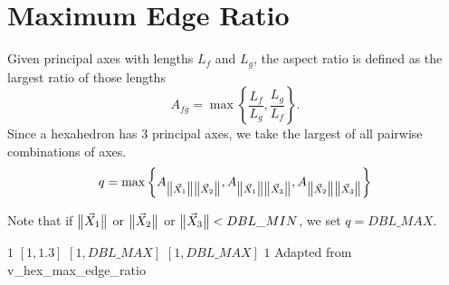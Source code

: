 \section{Maximum Edge Ratio}

Given principal axes with lengths $L_f$ and $L_g$,
the aspect ratio is defined as the largest ratio of those lengths
\[
   A_{fg} = \max\left\{ \frac{L_f}{L_g}, \frac{L_g}{L_f} \right\}.
\]
Since a hexahedron has 3 principal axes, we take the largest of all pairwise combinations of axes.
\[
  q  = \max\left\{
    A_{\big\lVert{\vec X_1 }\big\rVert\big\lVert{\vec X_2 }\big\rVert},
    A_{\big\lVert{\vec X_1 }\big\rVert\big\lVert{\vec X_3 }\big\rVert},
    A_{\big\lVert{\vec X_2 }\big\rVert\big\lVert{\vec X_3 }\big\rVert}
  \right\}
\]

Note that if $\big\lVert{\vec X_1}\big\rVert$ or $\big\lVert{\vec X_2}\big\rVert$ or $\big\lVert{\vec X_3}\big\rVert < DBL\_MIN$, we set $q = DBL\_MAX$.

%
{$1$}%
{$[1,1.3]$}%
{$[1,DBL\_MAX]$}%
{$[1,DBL\_MAX]$}%
{$1$}%
{Adapted from \cite{tf:89}}%
{v\_hex\_max\_edge\_ratio}%
